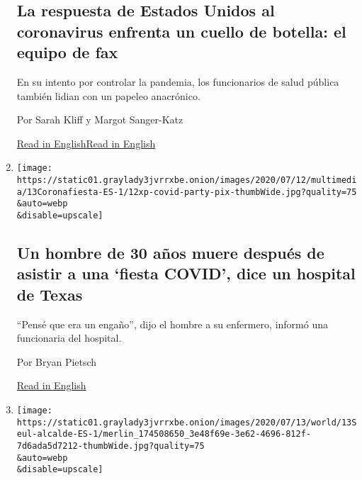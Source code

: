 \begin{enumerate}
  \hypertarget{la-respuesta-de-estados-unidos-al-coronavirus-enfrenta-un-cuello-de-botella-el-equipo-de-fax}{%
  \subsection{La respuesta de Estados Unidos al coronavirus enfrenta un
  cuello de botella: el equipo de
  fax}\label{la-respuesta-de-estados-unidos-al-coronavirus-enfrenta-un-cuello-de-botella-el-equipo-de-fax}}

  En su intento por controlar la pandemia, los funcionarios de salud
  pública también lidian con un papeleo anacrónico.

  Por Sarah Kliff y Margot Sanger-Katz

  \href{https://www.nytimes3xbfgragh.onion/2020/07/13/upshot/coronavirus-response-fax-machines.html}{Read
  in
  English}\href{https://www.nytimes3xbfgragh.onion/2020/07/13/upshot/coronavirus-response-fax-machines.html}{Read
  in English}
\item
  \href{/es/2020/07/13/espanol/mundo/fiesta-covid.html}{}

  \texttt{[image: https://static01.graylady3jvrrxbe.onion/images/2020/07/12/multimedia/13Coronafiesta-ES-1/12xp-covid-party-pix-thumbWide.jpg?quality=75\\\&auto=webp\\\&disable=upscale]}

  \hypertarget{un-hombre-de-30-auxf1os-muere-despuuxe9s-de-asistir-a-una-fiesta-covid-dice-un-hospital-de-texas}{%
  \subsection{Un hombre de 30 años muere después de asistir a una
  `fiesta COVID', dice un hospital de
  Texas}\label{un-hombre-de-30-auxf1os-muere-despuuxe9s-de-asistir-a-una-fiesta-covid-dice-un-hospital-de-texas}}

  ``Pensé que era un engaño'', dijo el hombre a su enfermero, informó
  una funcionaria del hospital.

  Por Bryan Pietsch

  \href{https://www.nytimes3xbfgragh.onion/2020/07/12/us/30-year-old-covid-party-death.html}{Read
  in English}
\item
  \href{/es/2020/07/13/espanol/mundo/park-won-soon-suicidio.html}{}

  \texttt{[image: https://static01.graylady3jvrrxbe.onion/images/2020/07/13/world/13Seul-alcalde-ES-1/merlin\_174508650\_3e48f69e-3e62-4696-812f-7d6ada5d7212-thumbWide.jpg?quality=75\\\&auto=webp\\\&disable=upscale]}


\end{enumerate}
